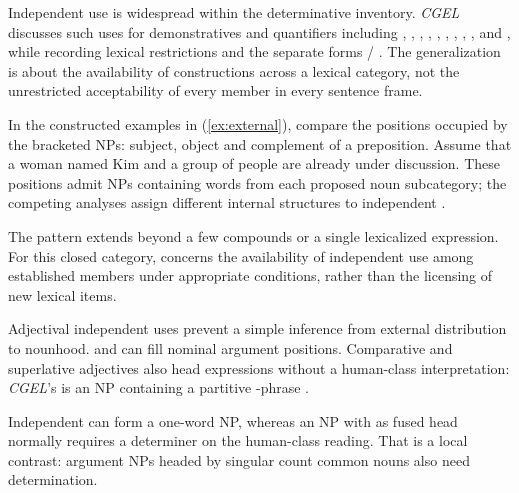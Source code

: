 \documentclass[12pt]{article}
\begin{document}
Independent use is widespread within the determinative inventory. \textit{CGEL} discusses such uses for demonstratives and quantifiers including , , , , , , , , ,  and , while recording lexical restrictions and the separate forms / \citep[371--372, 410--424]{huddleston2002}. The generalization is about the availability of constructions across a lexical category, not the unrestricted acceptability of every member in every sentence frame.

In the constructed examples in (\ref{ex:external}), compare the positions occupied by the bracketed NPs: subject, object and complement of a preposition. Assume that a woman named Kim and a group of people are already under discussion. These positions admit NPs containing words from each proposed noun subcategory; the competing analyses assign different internal structures to independent .

\ea\label{ex:external}
\ea {}\qquad {}\qquad {}
\ex {}\qquad {}\qquad {}
\ex {}\qquad {}\qquad {}
\ex {}\qquad {}\qquad {}
\z\z

The pattern extends beyond a few compounds or a single lexicalized expression. For this closed category,  concerns the availability of independent use among established members under appropriate conditions, rather than the licensing of new lexical items.

Adjectival independent uses prevent a simple inference from external distribution to nounhood.  and  can fill nominal argument positions. Comparative and superlative adjectives also head expressions without a human-class interpretation: \textit{CGEL}'s  is an NP containing a partitive -phrase \citep[332--333, 416--423]{huddleston2002}.

Independent  can form a one-word NP, whereas an NP with  as fused head normally requires a determiner on the human-class reading. That is a local contrast: argument NPs headed by singular count common nouns also need determination.
\end{document}
